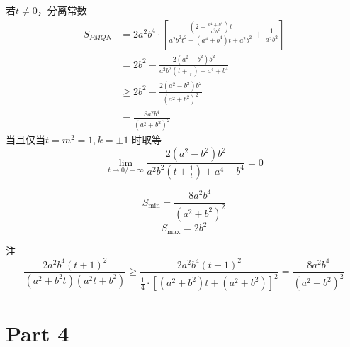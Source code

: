 \documentclass[UTF8]{article}
\begin{document}
若$t \ne   0$，分离常数
$$
\begin{aligned}
 {S_{PMQN}}& = 2{a^2}{b^4} \cdot \left[ {\frac{{\left( {2 - \frac{{{a^4} + {b^4}}}{{{a^2}{b^2}}}} \right)t}}{{{a^2}{b^2}{t^2} + ({a^4} + {b^4})t + {a^2}{b^2}}} + \frac{1}{{{a^2}{b^2}}}} \right]
 \\&=2{b^2} - \frac{{2({a^2} - {b^2}){b^2}}}{{{a^2}{b^2}\left( {t + \frac{1}{t}} \right) + {a^4} + {b^4}}}
 \\&\ge 2{b^2} - \frac{{2({a^2} - {b^2}){b^2}}}{{{{({a^2} + {b^2})}^2}}}
 \\&=\frac{{8{a^2}{b^4}}}{{{{({a^2} + {b^2})}^2}}}
\end{aligned}
$$
当且仅当$t=m^2=1,k=\pm 1$ 时取等
$$
\lim_{t \to 0/+\infty} \frac{{2({a^2} - {b^2}){b^2}}}{{{a^2}{b^2}\left( {t + \frac{1}{t}} \right) + {a^4} + {b^4}}}=0
$$

$$
  {S_{{\text{min}}}}=\frac{{8{a^2}{b^4}}}{{{{({a^2} + {b^2})}^2}}}
  $$
$$
  {S_{{\text{max}}}}  = 2{b^2}
$$

注
$$
\frac{{2{a^2}{b^4}{{({t} + 1)}^2}}}{{({a^2} + {b^2}{t})({a^2}{t} + {b^2})}}\ge\frac{{2{a^2}{b^4}{{(t + 1)}^2}}}{{\frac{1}{4} \cdot {{[({a^2} + {b^2})t + ({a^2} + {b^2})]}^2}}}=\frac{{8{a^2}{b^4}}}{{{{({a^2} + {b^2})}^2}}}
$$
\section{Part 4}

 \wedge 
 


\end{document}
